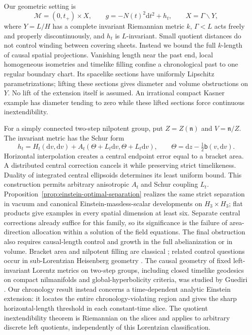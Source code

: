 \documentclass[10pt,a4paper]{article}
\numberwithin{equation}{section}
\theoremstyle{definition}
\theoremstyle{remark}
\newcommand{\dd}{\mathrm d}
\newcommand{\cM}{\mathcal M}
\begin{document}
Our geometric setting is
\begin{equation}
 \cM=(0,t_+)\times X,\qquad
 g=-N(t)^2\dd t^2+h_t,\qquad X=\Gamma\backslash Y,
 \label{eq:intro-spacetime}
\end{equation}
where $Y=L/H$ has a complete invariant Riemannian metric $k$,
$\Gamma<L$ acts freely and properly discontinuously, and $h_t$ is
$L$-invariant.  Small quotient distances do not control winding between
covering sheets.  Instead we bound the full $k$-length of causal spatial
projections.  Vanishing length near the past end, local homogeneous
isometries and timelike filling confine a chronological past to one
regular boundary chart.  Its spacelike sections have uniformly Lipschitz
parametrizations; lifting these sections gives diameter and volume
obstructions on $Y$.  No lift of the extension itself is assumed.  An
irrational compact Kasner example has diameter tending to zero while
these lifted sections force continuous inextendibility.

For a simply connected two-step nilpotent group, put
$Z=Z(\mathfrak n)$ and $V=\mathfrak n/Z$.  The invariant metric has
the Schur form
\begin{equation}
 h_t=H_t(\dd v,\dd v)+
 A_t(\Theta+L_t\dd v,\Theta+L_t\dd v),\qquad
 \Theta=\dd z-\tfrac12\mathsf b(v,\dd v).
 \label{eq:intro-schur}
\end{equation}
Horizontal interpolation creates a central endpoint error equal to a
bracket area.  A distributed central correction cancels it while
preserving strict timelikeness.  Duality of integrated central ellipsoids
determines its least uniform bound.  This construction permits arbitrary
anisotropic $A_t$ and Schur coupling $L_t$.
Proposition~\ref{prop:einstein-optimal-separation} realizes the same
strict separation in vacuum and canonical Einstein-massless-scalar
developments on $H_3\times H_3$; flat products give examples in every
spatial dimension at least six.  Separate central corrections already
suffice for this family, so its significance is the failure of
area-direction allocation within a solution of the field equations.
The final obstruction also requires causal-length control and growth
in the full abelianization or in volume.  Bracket area and nilpotent
filling are classical \cite{Milnor1976,Eberlein1994,Young2013}; related
control questions occur in sub-Lorentzian Heisenberg geometry
\cite{Grochowski2006,SachkovSachkova2023}.
The causal geometry of fixed left-invariant Lorentz metrics on two-step
groups, including closed timelike geodesics on compact nilmanifolds and
global-hyperbolicity criteria, was studied by Guediri
\cite{GuediriLorentz2003,GuediriGlobal2003,GuediriCriterion2008}.  Our
chronology result instead concerns a time-dependent analytic Einstein
extension: it locates the entire chronology-violating region and gives
the sharp horizontal-length threshold in each constant-time slice.  The
quotient inextendibility theorem is Riemannian on the slices and applies
to arbitrary discrete left quotients, independently of this Lorentzian
classification.
\end{document}
